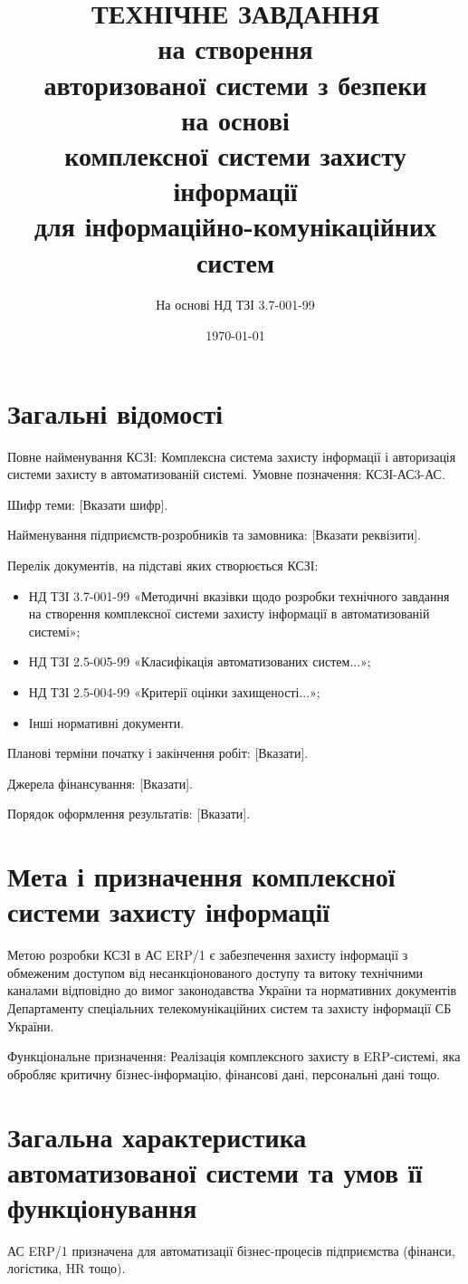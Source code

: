 \documentclass{article}
\title{ТЕХНІЧНЕ ЗАВДАННЯ \\ на створення \\ авторизованої системи з безпеки \\ на основі \\ комплексної системи захисту інформації \\ для інформаційно-комунікаційних систем}
\author{На основі НД ТЗІ 3.7-001-99}
\date{\today}
\begin{document}
\maketitle

\section{Загальні відомості}
Повне найменування КСЗІ: Комплексна система захисту інформації і авторизація системи захисту в автоматизованій системі.
Умовне позначення: КСЗІ-АС3-АС.

Шифр теми: [Вказати шифр].

Найменування підприємств-розробників та замовника: [Вказати реквізити].

Перелік документів, на підставі яких створюється КСЗІ:
\begin{itemize}
    \item НД ТЗІ 3.7-001-99 «Методичні вказівки щодо розробки технічного завдання на створення комплексної системи захисту інформації в автоматизованій системі»;
    \item НД ТЗІ 2.5-005-99 «Класифікація автоматизованих систем...»;
    \item НД ТЗІ 2.5-004-99 «Критерії оцінки захищеності...»;
    \item Інші нормативні документи.
\end{itemize}

Планові терміни початку і закінчення робіт: [Вказати].

Джерела фінансування: [Вказати].

Порядок оформлення результатів: [Вказати].

\section{Мета і призначення комплексної системи захисту інформації}
Метою розробки КСЗІ в АС ERP/1 є забезпечення захисту інформації з обмеженим доступом від несанкціонованого доступу та витоку технічними каналами відповідно до вимог законодавства України та нормативних документів Департаменту спеціальних телекомунікаційних систем та захисту інформації СБ України.

Функціональне призначення: Реалізація комплексного захисту в ERP-системі, яка обробляє критичну бізнес-інформацію, фінансові дані, персональні дані тощо.

\section{Загальна характеристика автоматизованої системи та умов її функціонування}
АС ERP/1 призначена для автоматизації бізнес-процесів підприємства (фінанси, логістика, HR тощо).
\end{document}
